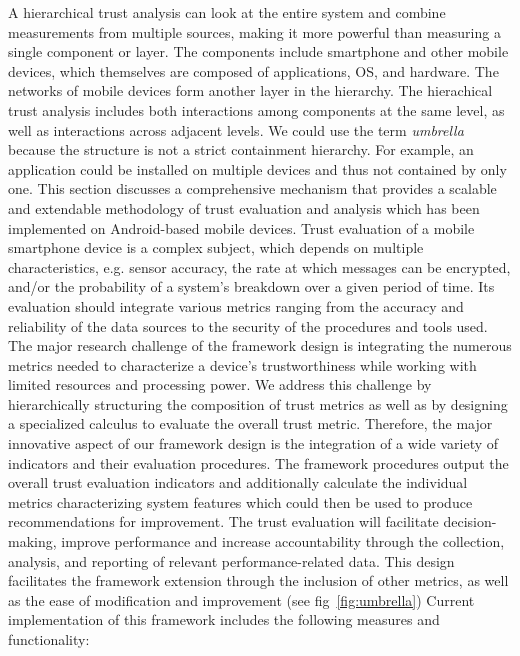A hierarchical trust analysis can look at the entire system and combine measurements from multiple sources, making
it more powerful than measuring a single component or layer.  The components include smartphone and other mobile
devices, which themselves are composed of applications, OS, and hardware. The networks of mobile devices form another 
layer in the hierarchy.  The hierachical trust analysis includes both interactions among components at the same level,
as well as interactions across adjacent levels.  We could use the term {\it umbrella} because the structure is not
a strict containment hierarchy.  For example, an application could be installed on multiple devices and thus not
contained by only one.
This section discusses a comprehensive mechanism that provides a scalable and extendable methodology of trust
 evaluation and analysis which has been implemented on Android-based mobile devices.
Trust evaluation of a mobile smartphone device is a complex subject, which depends on multiple characteristics, 
e.g. sensor accuracy, the rate at which messages can be encrypted,  %
 and/or the probability of a system's breakdown over a given period of time. Its evaluation should integrate various 
 metrics ranging from the accuracy and reliability of the data sources to the security of the procedures and tools 
 used. The major research challenge of the framework design is integrating the numerous metrics needed to characterize
 a device's trustworthiness while working with limited resources and processing power. 
We address this challenge by hierarchically structuring the composition of trust metrics as well as by designing a specialized calculus to evaluate the overall trust metric. 
Therefore, the major innovative aspect of our framework design is the integration of a wide variety of indicators and their evaluation procedures. The framework procedures output the overall trust evaluation indicators and additionally 
calculate the individual metrics characterizing system features which could then be used to produce recommendations for improvement. 
The trust evaluation will facilitate decision-making, improve performance and increase accountability through the collection, 
analysis, and reporting of relevant performance-related data. This design facilitates the framework extension through the 
inclusion of other metrics, as well as the ease of modification and improvement (see fig~\ref{fig:umbrella})
Current implementation of this framework includes the following measures and functionality: 

